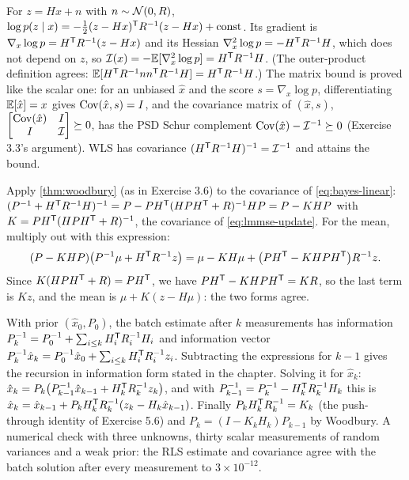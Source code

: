 \begin{solutions}
  \item For $z = Hx + n$ with $n \sim \mathcal{N}(0, R)$, $\log p(z\mid x) = -\tfrac12(z - Hx)^{\mathsf{T}} R^{-1}(z - Hx) + \text{const}$. Its gradient is
        $\nabla_x\log p = H^{\mathsf{T}} R^{-1}(z - Hx)$ and its Hessian $\nabla_x^2\log p = -H^{\mathsf{T}} R^{-1} H$, which does not depend on $z$, so
        $\mathcal I(x) = -\mathbb{E}[\nabla_x^2\log p] = H^{\mathsf{T}} R^{-1} H$. (The outer-product definition agrees: $\mathbb{E}[H^{\mathsf{T}} R^{-1} nn^{\mathsf{T}} R^{-1} H] = H^{\mathsf{T}} R^{-1} H$.) The matrix bound is
        proved like the scalar one: for an unbiased $\hat x$ and the score $s = \nabla_x\log p$, differentiating $\mathbb{E}[\hat x] = x$ gives $\operatorname{Cov}(\hat x, s) = I$, and
        the covariance matrix of $(\hat x, s)$,
        $\begin{bmatrix}\operatorname{Cov}(\hat x) & I\\ I & \mathcal I\end{bmatrix} \succeq 0$, has the PSD Schur complement $\operatorname{Cov}(\hat x) - \mathcal I^{-1} \succeq 0$ (Exercise 3.3's argument).
        WLS has covariance $(H^{\mathsf{T}} R^{-1} H)^{-1} = \mathcal I^{-1}$ and attains the bound.

  \item Apply \cref{thm:woodbury} (as in Exercise 3.6) to the covariance of \eqref{eq:bayes-linear}:
        $(P^{-1} + H^{\mathsf{T}} R^{-1} H)^{-1} = P - PH^{\mathsf{T}}(HPH^{\mathsf{T}} + R)^{-1} HP = P - KHP$ with $K = PH^{\mathsf{T}}(HPH^{\mathsf{T}} + R)^{-1}$, the covariance of \eqref{eq:lmmse-update}. For the mean,
        multiply out with this expression:
        \[
          (P - KHP)\big(P^{-1}\mu + H^{\mathsf{T}} R^{-1} z\big) = \mu - KH\mu + \big(PH^{\mathsf{T}} - KHPH^{\mathsf{T}}\big)R^{-1} z .
        \]
        Since $K(HPH^{\mathsf{T}} + R) = PH^{\mathsf{T}}$, we have $PH^{\mathsf{T}} - KHPH^{\mathsf{T}} = KR$, so the last term is $Kz$, and the mean is $\mu + K(z - H\mu)$: the two forms agree.

  \item With prior $(\hat x_0, P_0)$, the batch estimate after $k$ measurements has information $P_k^{-1} = P_0^{-1} + \sum_{i\le k}H_i^{\mathsf{T}} R_i^{-1} H_i$ and information
        vector $P_k^{-1}\hat x_k = P_0^{-1}\hat x_0 + \sum_{i\le k}H_i^{\mathsf{T}} R_i^{-1} z_i$. Subtracting the expressions for $k - 1$ gives the recursion in information form
        stated in the chapter. Solving it for $\hat x_k$: $\hat x_k = P_k\big(P_{k-1}^{-1}\hat x_{k-1} + H_k^{\mathsf{T}} R_k^{-1} z_k\big)$, and with
        $P_{k-1}^{-1} = P_k^{-1} - H_k^{\mathsf{T}} R_k^{-1} H_k$ this is $\hat x_k = \hat x_{k-1} + P_kH_k^{\mathsf{T}} R_k^{-1}(z_k - H_k\hat x_{k-1})$. Finally $P_kH_k^{\mathsf{T}} R_k^{-1} = K_k$ (the
        push-through identity of Exercise 5.6) and $P_k = (I - K_kH_k)P_{k-1}$ by Woodbury. A numerical check with three unknowns, thirty scalar
        measurements of random variances and a weak prior: the RLS estimate and covariance agree with the batch solution after every
        measurement to $3\times10^{-12}$.


\end{solutions}
